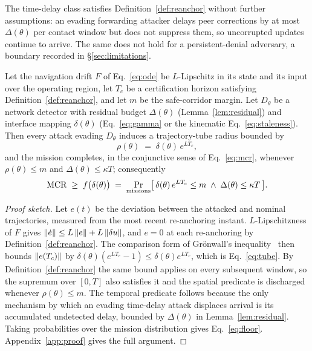 The time-delay class satisfies Definition~\ref{def:reanchor} without further
assumptions: an evading forwarding attacker delays peer corrections by at most
$\Delta(\theta)$ per contact window but does not suppress them, so uncorrupted
updates continue to arrive. The same does not hold for a persistent-denial
adversary, a boundary recorded in \S\ref{sec:limitations}.

\begin{theorem}
\label{thm:main}
Let the navigation drift $F$ of Eq.~\eqref{eq:ode} be $L$-Lipschitz in its state
and its input over the operating region, let $T_c$ be a certification horizon satisfying
Definition~\ref{def:reanchor}, and let $m$ be the safe-corridor margin. Let
$D_\theta$ be a network detector with residual budget $\Delta(\theta)$
(Lemma~\ref{lem:residual}) and interface mapping $\delta(\theta)$
(Eq.~\eqref{eq:gamma} or the kinematic Eq.~\eqref{eq:staleness}). Then every attack
evading $D_\theta$ induces a trajectory-tube radius bounded by
\begin{equation}
\label{eq:tube}
\rho(\theta) \;=\; \delta(\theta)\,e^{L T_c},
\end{equation}
and the mission completes, in the conjunctive sense of Eq.~\eqref{eq:mcr},
whenever $\rho(\theta)\le m$ and $\Delta(\theta)\le\kappa T$; consequently
\begin{equation}
\label{eq:floor}
\mathrm{MCR} \;\ge\; f\big(\delta(\theta)\big) \;=\;
\Pr_{\text{missions}}\!\big[\,\delta(\theta)\,e^{LT_c}\le m
\;\wedge\; \Delta(\theta)\le\kappa T\,\big].
\end{equation}
\end{theorem}
\begin{proof}[Proof sketch]
Let $e(t)$ be the deviation between the attacked and nominal trajectories,
measured from the most recent re-anchoring instant. $L$-Lipschitzness of $F$
gives $\left\lVert \dot e\right\rVert\le L\left\lVert e\right\rVert+L\left\lVert \delta u\right\rVert$, and $e=0$ at each
re-anchoring by Definition~\ref{def:reanchor}. The comparison form of
Gr\"onwall's inequality~\cite{gronwall1919} then bounds $\left\lVert e(T_c)\right\rVert$ by
$\delta(\theta)(e^{LT_c}-1)\le\delta(\theta)e^{LT_c}$, which is
Eq.~\eqref{eq:tube}. By
Definition~\ref{def:reanchor} the same bound applies on every subsequent window,
so the supremum over $[0,T]$ also satisfies it and the spatial
predicate is discharged whenever $\rho(\theta)\le m$. The temporal predicate follows because
the only mechanism by which an evading time-delay attack displaces arrival is
its accumulated undetected delay, bounded by $\Delta(\theta)$ in
Lemma~\ref{lem:residual}. Taking probabilities over the mission distribution
gives Eq.~\eqref{eq:floor}. Appendix~\ref{app:proof} gives the full argument.
\end{proof}

